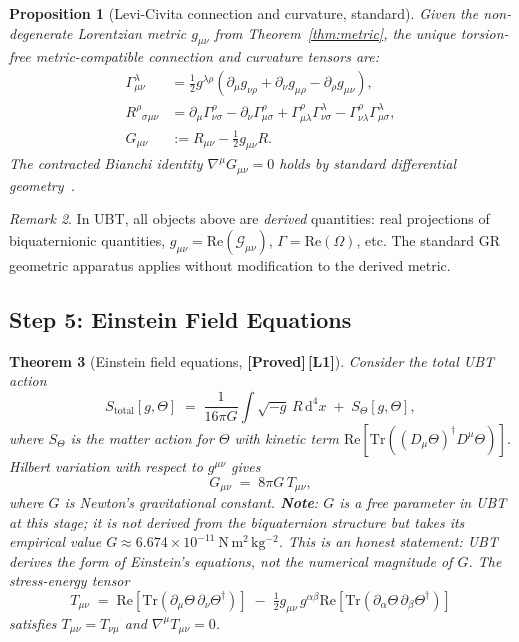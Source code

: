 \documentclass[12pt,a4paper]{article}
\newtheorem{theorem}{Theorem}[section]
\newtheorem{proposition}[theorem]{Proposition}
\theoremstyle{definition}
\theoremstyle{remark}
\newtheorem{remark}[theorem]{Remark}
\newcommand{\PROVED}{\textbf{[Proved]}}
\newcommand{\Lone}{\textbf{[L1]}}
\newcommand{\Tr}{\mathrm{Tr}}
\newcommand{\re}{\mathrm{Re}}
\newcommand{\calG}{\mathcal{G}}
\begin{document}
\begin{proposition}[Levi-Civita connection and curvature, standard]
\label{prop:geometry}
Given the non-degenerate Lorentzian metric $g_{\mu\nu}$ from
Theorem~\ref{thm:metric}, the unique torsion-free metric-compatible connection
and curvature tensors are:
\begin{align}
  \Gamma^\lambda_{\mu\nu}
    &= \tfrac{1}{2}g^{\lambda\rho}
       (\partial_\mu g_{\nu\rho} + \partial_\nu g_{\mu\rho}
        - \partial_\rho g_{\mu\nu}), \\
  R^\rho{}_{\sigma\mu\nu}
    &= \partial_\mu\Gamma^\rho_{\nu\sigma}
       - \partial_\nu\Gamma^\rho_{\mu\sigma}
       + \Gamma^\rho_{\mu\lambda}\Gamma^\lambda_{\nu\sigma}
       - \Gamma^\rho_{\nu\lambda}\Gamma^\lambda_{\mu\sigma}, \\
  G_{\mu\nu}
    &:= R_{\mu\nu} - \tfrac{1}{2}g_{\mu\nu}R.
\end{align}
The contracted Bianchi identity $\nabla^\mu G_{\mu\nu} = 0$ holds by standard
differential geometry~\cite{wald1984,mtw1973}.
\end{proposition}

\begin{remark}
In UBT, all objects above are \emph{derived} quantities: real projections of
biquaternionic quantities,
$g_{\mu\nu} = \re(\calG_{\mu\nu})$,
$\Gamma = \re(\Omega)$, etc.
The standard GR geometric apparatus applies without modification to the
derived metric.
\end{remark}

\subsection{Step 5: Einstein Field Equations}
\label{sec:step5}

\begin{theorem}[Einstein field equations, \PROVED\,\Lone]
\label{thm:einstein}
Consider the total UBT action
\[
  S_{\mathrm{total}}[g,\Theta]
  \;=\; \frac{1}{16\pi G}\int\!\!\sqrt{-g}\,R\,\mathrm{d}^4x
  \;+\; S_\Theta[g,\Theta],
\]
where $S_\Theta$ is the matter action for $\Theta$ with kinetic term
$\re[\Tr((D_\mu\Theta)^\dagger D^\mu\Theta)]$.
Hilbert variation with respect to $g^{\mu\nu}$ gives
\[
  G_{\mu\nu} \;=\; 8\pi G\,T_{\mu\nu},
\]
where $G$ is Newton's gravitational constant.
\textbf{Note}: $G$ is a free parameter in UBT at this stage; it is not
derived from the biquaternion structure but takes its empirical value
$G \approx 6.674 \times 10^{-11}\ \mathrm{N\,m^2\,kg^{-2}}$.
This is an honest statement: UBT derives the \emph{form} of Einstein's
equations, not the numerical magnitude of $G$.
The stress-energy tensor
\[
  T_{\mu\nu}
  \;=\; \re[\Tr(\partial_\mu\Theta\,\partial_\nu\Theta^\dagger)]
  \;-\; \tfrac{1}{2}g_{\mu\nu}\,g^{\alpha\beta}
        \re[\Tr(\partial_\alpha\Theta\,\partial_\beta\Theta^\dagger)]
\]
satisfies $T_{\mu\nu} = T_{\nu\mu}$ and $\nabla^\mu T_{\mu\nu} = 0$.
\end{theorem}
\end{document}
